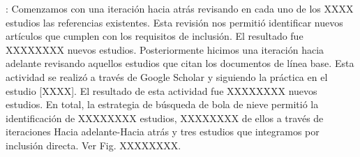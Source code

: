 : Comenzamos con una iteración hacia atrás revisando en cada uno de los XXXX estudios las referencias existentes. Esta revisión nos permitió identificar nuevos artículos que cumplen con los requisitos de inclusión. El resultado fue XXXXXXXX nuevos estudios.
Posteriormente hicimos una iteración hacia adelante revisando aquellos estudios que citan los documentos de línea base. Esta actividad se realizó a través de Google Scholar y siguiendo la práctica en el estudio [XXXX]. El resultado de esta actividad fue XXXXXXXX nuevos estudios. En total, la estrategia de búsqueda de bola de nieve permitió la identificación de XXXXXXXX estudios, XXXXXXXX de ellos a través de iteraciones Hacia adelante-Hacia atrás y tres estudios que integramos por inclusión directa. Ver Fig. XXXXXXXX.
